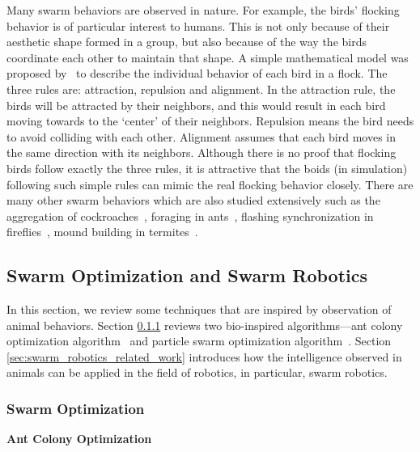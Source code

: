 Many swarm behaviors are observed in nature. For example, the birds' flocking behavior is of particular interest to humans. This is not only because of their aesthetic shape formed in a group, but also because of the way the birds coordinate each other to maintain that shape. A simple mathematical model was proposed by~\cite{Craig:CG:1987} to describe the individual behavior of each bird in a flock. The three rules are: attraction, repulsion and alignment. In the attraction rule, the birds will be attracted by their neighbors, and this would result in each bird moving towards to the `center' of their neighbors. Repulsion means the bird needs to avoid colliding with each other. Alignment assumes that each bird moves in the same direction with its neighbors. Although there is no proof that flocking birds follow exactly the three rules, it is attractive that the boids (in simulation) following such simple rules can mimic the real flocking behavior closely. There are many other swarm behaviors which are also studied extensively such as the aggregation of cockroaches~\cite{Jeanson:AB:2005}, foraging in ants~\cite{Carroll1973}, flashing synchronization in fireflies~\cite{James:ARE:1971}, mound building in termites~\cite{Bruinsma:PHD:1979}. 

\subsection{Swarm Optimization and Swarm Robotics}\label{sec:swarm_optimization_swarm_robotics}

In this section, we review some techniques that are inspired by observation of animal behaviors. Section \ref{sec:swarm_optimization_related_work} reviews two bio-inspired algorithms---ant colony optimization algorithm~\cite{Dorigo_1997} and particle swarm optimization algorithm~\cite{Kennedy:ICNN:1995}. Section \ref{sec:swarm_robotics_related_work} introduces how the intelligence observed in animals can be applied in the field of robotics, in particular, swarm robotics.

\subsubsection{Swarm Optimization}\label{sec:swarm_optimization_related_work}

\textbf{Ant Colony Optimization}

